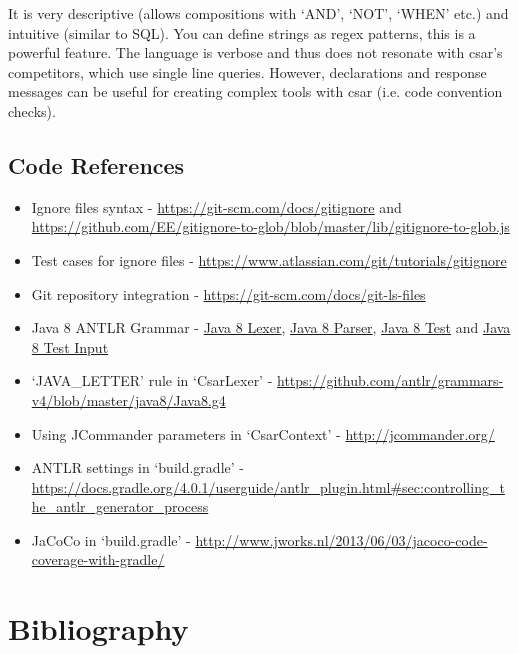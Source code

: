 \documentclass[12pt, letterpaper]{article}
\begin{document}
It is very descriptive (allows compositions with `AND', `NOT', `WHEN' etc.) and intuitive (similar to SQL). You can define strings as regex patterns, this is a powerful feature.
The language is verbose and thus does not resonate with csar's competitors, which use single line queries.
However, declarations and response messages can be useful for creating complex tools with csar (i.e. code convention checks).

\subsection{Code References}
\begin{itemize}
  \item Ignore files syntax - \url{https://git-scm.com/docs/gitignore} and \url{https://github.com/EE/gitignore-to-glob/blob/master/lib/gitignore-to-glob.js}
  \item Test cases for ignore files - \url{https://www.atlassian.com/git/tutorials/gitignore}
  \item Git repository integration - \url{https://git-scm.com/docs/git-ls-files}
  \item Java 8 ANTLR Grammar - \href{https://github.com/antlr/grammars-v4/blob/02711067f82bed8e0c8dfd25e80f4f8ae2472abd/java8-pt/JavaLexer.g4}{Java 8 Lexer}, \href{https://github.com/antlr/grammars-v4/blob/02711067f82bed8e0c8dfd25e80f4f8ae2472abd/java8-pt/JavaParser.g4}{Java 8 Parser}, \href{https://github.com/antlr/grammars-v4/blob/02711067f82bed8e0c8dfd25e80f4f8ae2472abd/_grammar-test/src/test/java/TestJava8pt.java}{Java 8 Test} and \href{https://github.com/antlr/grammars-v4/blob/02711067f82bed8e0c8dfd25e80f4f8ae2472abd/java8-pt/examples/AllInOne8.java}{Java 8 Test Input}
  \item `JAVA\_LETTER' rule in `CsarLexer' - \url{https://github.com/antlr/grammars-v4/blob/master/java8/Java8.g4}
  \item Using JCommander parameters in `CsarContext' - \url{http://jcommander.org/}
  \item ANTLR settings in `build.gradle' - \url{https://docs.gradle.org/4.0.1/userguide/antlr\_plugin.html\#sec:controlling\_the\_antlr\_generator\_process}
  \item JaCoCo in `build.gradle' - \url{http://www.jworks.nl/2013/06/03/jacoco-code-coverage-with-gradle/}
\end{itemize}

\section{Bibliography}
\printbibliography[heading=none]
\end{document}
